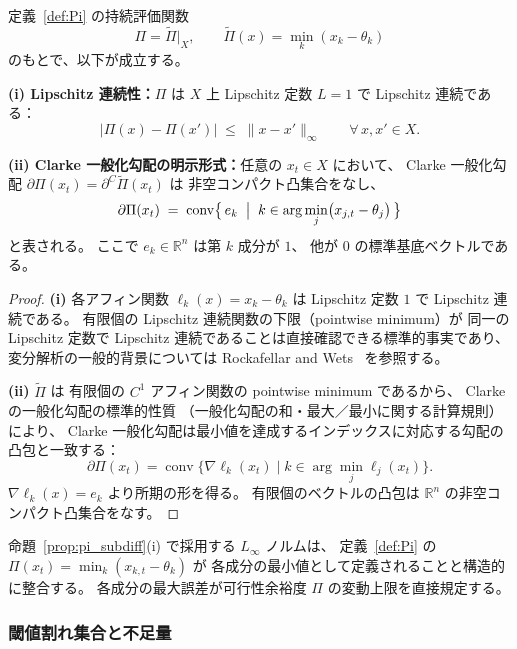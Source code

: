 \begin{proposition}
\label{prop:pi_subdiff}
定義~\ref{def:Pi} の持続評価関数
\[
  \Pi=\widetilde{\Pi}|_X,
  \qquad
  \widetilde{\Pi}(x)
  =
  \min_k(x_k-\theta_k)
\]
のもとで、以下が成立する。

\textbf{(i) Lipschitz 連続性：}$\Pi$ は $X$ 上 Lipschitz 定数 $L=1$ で Lipschitz 連続である：
\[
  |\Pi(x)-\Pi(x')| \;\le\; \|x-x'\|_\infty \qquad \forall\, x,x'\in X.
\]

\textbf{(ii) Clarke 一般化勾配の明示形式：}任意の $x_t\in X$ において、
Clarke 一般化勾配 $\partial\Pi(x_t)=\partial^C\widetilde{\Pi}(x_t)$ は
非空コンパクト凸集合をなし、
\[
  \partial\Pi(x_t)\;=\;\operatorname{conv}\bigl\{\,e_k \;\bigm|\; k\in\arg\min_j\bigl(x_{j,t}-\theta_j\bigr)\,\bigr\}
\]
と表される。
ここで $e_k\in\mathbb{R}^n$ は第 $k$ 成分が $1$、
他が $0$ の標準基底ベクトルである。
\end{proposition}

\begin{proof}
\textbf{(i)} 各アフィン関数 $\ell_k(x)=x_k-\theta_k$ は
Lipschitz 定数 $1$ で Lipschitz 連続である。
有限個の Lipschitz 連続関数の下限（pointwise minimum）が
同一の Lipschitz 定数で Lipschitz 連続であることは直接確認できる標準的事実であり、
変分解析の一般的背景については
Rockafellar and Wets~\cite{RockafellarWets1998} を参照する。

\textbf{(ii)} $\widetilde{\Pi}$ は
有限個の $C^1$ アフィン関数の pointwise minimum であるから、
Clarke の一般化勾配の標準的性質\cite{Clarke1990}
（一般化勾配の和・最大／最小に関する計算規則）により、
Clarke 一般化勾配は最小値を達成するインデックスに対応する勾配の凸包と一致する：
\[
  \partial\Pi(x_t)=\operatorname{conv}\bigl\{\nabla\ell_k(x_t)\mid k\in\arg\min_j\ell_j(x_t)\bigr\}.
\]
$\nabla\ell_k(x)=e_k$ より所期の形を得る。
有限個のベクトルの凸包は $\mathbb{R}^n$ の非空コンパクト凸集合をなす。
\end{proof}

\begin{remark}
\label{rem:linf}
命題~\ref{prop:pi_subdiff}(i) で採用する $L_\infty$ ノルムは、
定義~\ref{def:Pi} の $\Pi(x_t)=\min_k(x_{k,t}-\theta_k)$ が
各成分の最小値として定義されることと構造的に整合する。
各成分の最大誤差が可行性余裕度 $\Pi$ の変動上限を直接規定する。
\end{remark}

\subsubsection{閾値割れ集合と不足量}

